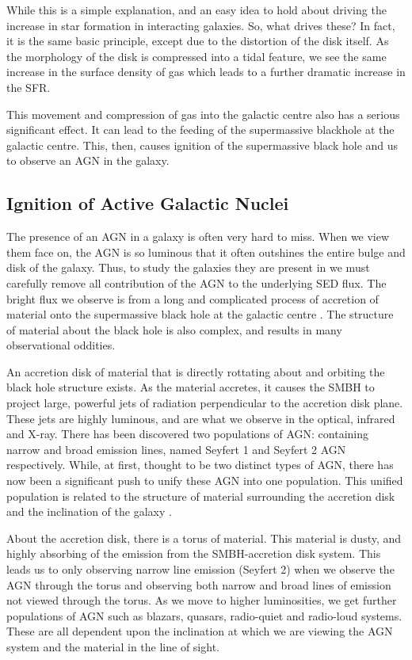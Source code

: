 While this is a simple explanation, and an easy idea to hold about driving the increase in star formation in interacting galaxies. So, what drives these? In fact, it is the same basic principle, except due to the distortion of the disk itself. As the morphology of the disk is compressed into a tidal feature, we see the same increase in the surface density of gas which leads to a further dramatic increase in the SFR. 

This movement and compression of gas into the galactic centre also has a serious significant effect. It can lead to the feeding of the supermassive blackhole at the galactic centre. This, then, causes ignition of the supermassive black hole and us to observe an AGN in the galaxy.

\subsection{Ignition of Active Galactic Nuclei}
\noindent The presence of an AGN in a galaxy is often very hard to miss. When we view them face on, the AGN is so luminous that it often outshines the entire bulge and disk of the galaxy. Thus, to study the galaxies they are present in we must carefully remove all contribution of the AGN to the underlying SED flux. The bright flux we observe is from a long and complicated process of accretion of material onto the supermassive black hole at the galactic centre \citep[for an excellent breakdown of the structure and evolution of AGN see][]{2012agn..book.....B}. The structure of material about the black hole is also complex, and results in many observational oddities. 

An accretion disk of material that is directly rottating about and orbiting the black hole structure exists. As the material accretes, it causes the SMBH to project large, powerful jets of radiation perpendicular to the accretion disk plane. These jets are highly luminous, and are what we observe in the optical, infrared and X-ray. There has been discovered two populations of AGN: containing narrow and broad emission lines, named Seyfert 1 and Seyfert 2 AGN respectively. While, at first, thought to be two distinct types of AGN, there has now been a significant push to unify these AGN into one population. This unified population is related to the structure of material surrounding the accretion disk and the inclination of the galaxy \citep[for a review of the unification, see][]{2015ARA&A..53..365N}.

About the accretion disk, there is a torus of material. This material is dusty, and highly absorbing of the emission from the SMBH-accretion disk system. This leads us to only observing narrow line emission (Seyfert 2) when we observe the AGN through the torus and observing both narrow and broad lines of emission not viewed through the torus. As we move to higher luminosities, we get further populations of AGN such as blazars, quasars, radio-quiet and radio-loud systems. These are all dependent upon the inclination at which we are viewing the AGN system and the material in the line of sight.

